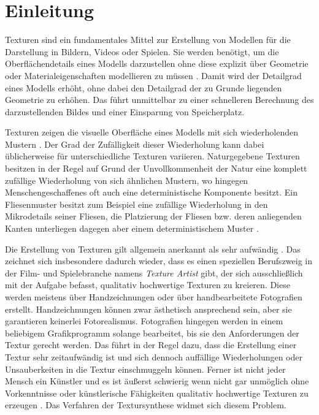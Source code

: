\section{Einleitung}

Texturen sind ein fundamentales Mittel zur Erstellung von Modellen für die Darstellung in Bildern, Videos oder Spielen.
Sie werden benötigt, um die Oberflächendetails eines Modells darzustellen ohne diese explizit über Geometrie oder Materialeigenschaften modellieren zu müssen \cite{StateOfTheArt}.
Damit wird der Detailgrad eines Modells erhöht, ohne dabei den Detailgrad der zu Grunde liegenden Geometrie zu erhöhen.
Das führt unmittelbar zu einer schnelleren Berechnung des darzustellenden Bildes und einer Einsparung von Speicherplatz.

Texturen zeigen die visuelle Oberfläche eines Modells mit sich wiederholenden Mustern \cite{StateOfTheArt}.
Der Grad der Zufälligkeit dieser Wiederholung kann dabei üblicherweise für unterschiedliche Texturen variieren.
Naturgegebene Texturen besitzen in der Regel auf Grund der Unvollkommenheit der Natur eine komplett zufällige Wiederholung von sich ähnlichen Mustern, wo hingegen Menschengeschaffenes oft auch eine deterministische Komponente besitzt.
Ein Fliesenmuster besitzt zum Beispiel eine zufällige Wiederholung in den Mikrodetails seiner Fliesen, die Platzierung der Fliesen bzw. deren anliegenden Kanten unterliegen dagegen aber einem deterministischem Muster \cite{StateOfTheArt}.

Die Erstellung von Texturen gilt allgemein anerkannt als sehr aufwändig \cite{StateOfTheArt}.
Das zeichnet sich insbesondere dadurch wieder, dass es einen speziellen Berufszweig in der Film- und Spielebranche namens \emph{Texture Artist} gibt, der sich ausschließlich mit der Aufgabe befasst, qualitativ hochwertige Texturen zu kreieren.
Diese werden meistens über Handzeichnungen oder über handbearbeitete Fotografien erstellt.
Handzeichnungen können zwar ästhetisch ansprechend sein, aber sie garantieren keinerlei Fotorealismus.
Fotografien hingegen werden in einem beliebigem Grafikprogramm solange bearbeitet, bis sie den Anforderungen der Textur gerecht werden.
Das führt in der Regel dazu, dass die Erstellung einer Textur sehr zeitaufwändig ist und sich dennoch auffällige Wiederholungen oder Unsauberkeiten in die Textur einschmuggeln können.
Ferner ist nicht jeder Mensch ein Künstler und es ist äußerst schwierig wenn nicht gar unmöglich ohne Vorkenntnisse oder künstlerische Fähigkeiten qualitativ hochwertige Texturen zu erzeugen \cite{StateOfTheArt}.
Das Verfahren der Textursynthese widmet sich diesem Problem.

